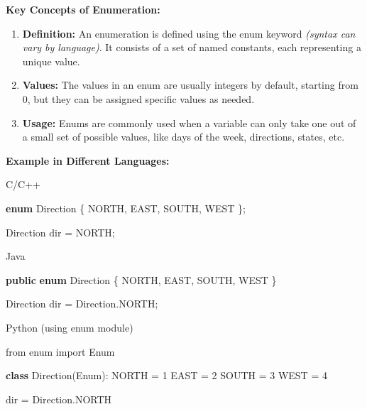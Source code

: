 \documentclass[
  letterpaper,
  DIV=11,
  numbers=noendperiod]{scrreprt}
\newenvironment{Shaded}{\begin{snugshade}}{\end{snugshade}}
\newcommand{\AttributeTok}[1]{\textcolor[rgb]{0.40,0.45,0.13}{#1}}
\newcommand{\BuiltInTok}[1]{\textcolor[rgb]{0.00,0.23,0.31}{#1}}
\newcommand{\DecValTok}[1]{\textcolor[rgb]{0.68,0.00,0.00}{#1}}
\newcommand{\ImportTok}[1]{\textcolor[rgb]{0.00,0.46,0.62}{#1}}
\newcommand{\KeywordTok}[1]{\textcolor[rgb]{0.00,0.23,0.31}{\textbf{#1}}}
\newcommand{\NormalTok}[1]{\textcolor[rgb]{0.00,0.23,0.31}{#1}}
\newcommand{\OperatorTok}[1]{\textcolor[rgb]{0.37,0.37,0.37}{#1}}
\providecommand{\tightlist}{%
  \setlength{\itemsep}{0pt}\setlength{\parskip}{0pt}}
\begin{document}
\textbf{Key Concepts of Enumeration:}

\begin{enumerate}
\def\labelenumi{\arabic{enumi}.}
\tightlist
\item
  \textbf{Definition:} An enumeration is defined using the enum keyword
  \emph{(syntax can vary by language)}. It consists of a set of named
  constants, each representing a unique value.
\item
  \textbf{Values:} The values in an enum are usually integers by
  default, starting from 0, but they can be assigned specific values as
  needed.
\item
  \textbf{Usage:} Enums are commonly used when a variable can only take
  one out of a small set of possible values, like days of the week,
  directions, states, etc.
\end{enumerate}

\textbf{Example in Different Languages:}

C/C++

\begin{Shaded}
\begin{Highlighting}[]
\KeywordTok{enum}\NormalTok{ Direction }\OperatorTok{\{}
\NormalTok{    NORTH}\OperatorTok{,}
\NormalTok{    EAST}\OperatorTok{,}
\NormalTok{    SOUTH}\OperatorTok{,}
\NormalTok{    WEST}
\OperatorTok{\};}

\NormalTok{Direction dir }\OperatorTok{=}\NormalTok{ NORTH}\OperatorTok{;}
\end{Highlighting}
\end{Shaded}

Java

\begin{Shaded}
\begin{Highlighting}[]
\KeywordTok{public} \KeywordTok{enum}\NormalTok{ Direction \{}
\NormalTok{    NORTH}\OperatorTok{,}
\NormalTok{    EAST}\OperatorTok{,}
\NormalTok{    SOUTH}\OperatorTok{,}
\NormalTok{    WEST}
\NormalTok{\}}

\NormalTok{Direction dir }\OperatorTok{=}\NormalTok{ Direction}\OperatorTok{.}\AttributeTok{NORTH}\OperatorTok{;}
\end{Highlighting}
\end{Shaded}

Python (using enum module)

\begin{Shaded}
\begin{Highlighting}[]
\ImportTok{from}\NormalTok{ enum }\ImportTok{import}\NormalTok{ Enum}

\KeywordTok{class}\NormalTok{ Direction(Enum):}
\NormalTok{    NORTH }\OperatorTok{=} \DecValTok{1}
\NormalTok{    EAST }\OperatorTok{=} \DecValTok{2}
\NormalTok{    SOUTH }\OperatorTok{=} \DecValTok{3}
\NormalTok{    WEST }\OperatorTok{=} \DecValTok{4}

\BuiltInTok{dir} \OperatorTok{=}\NormalTok{ Direction.NORTH}
\end{Highlighting}
\end{Shaded}
\end{document}
